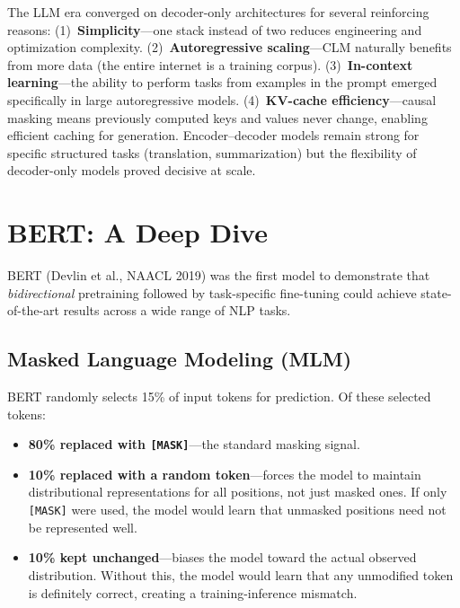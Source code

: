 \begin{keyinsight}
The LLM era converged on decoder-only architectures for several reinforcing
reasons: (1)~\textbf{Simplicity}---one stack instead of two reduces
engineering and optimization complexity. (2)~\textbf{Autoregressive scaling}---CLM
naturally benefits from more data (the entire internet is a training corpus).
(3)~\textbf{In-context learning}---the ability to perform tasks from examples in
the prompt emerged specifically in large autoregressive models.
(4)~\textbf{KV-cache efficiency}---causal masking means previously computed
keys and values never change, enabling efficient caching for generation.
Encoder--decoder models remain strong for specific structured tasks
(translation, summarization) but the flexibility of decoder-only models proved
decisive at scale.
\end{keyinsight}


\section{BERT: A Deep Dive}
\label{sec:bert}

BERT (Devlin et al., NAACL 2019) was the first model to demonstrate that
\emph{bidirectional} pretraining followed by task-specific fine-tuning could
achieve state-of-the-art results across a wide range of NLP tasks.

\subsection{Masked Language Modeling (MLM)}

BERT randomly selects 15\% of input tokens for prediction.  Of these selected
tokens:

\begin{itemize}
    \item \textbf{80\% replaced with \texttt{[MASK]}}---the standard masking
          signal.
    \item \textbf{10\% replaced with a random token}---forces the model to
          maintain distributional representations for all positions, not just
          masked ones.  If only \texttt{[MASK]} were used, the model would
          learn that unmasked positions need not be represented well.
    \item \textbf{10\% kept unchanged}---biases the model toward the actual
          observed distribution.  Without this, the model would learn that any
          unmodified token is definitely correct, creating a training-inference
          mismatch.
\end{itemize}

